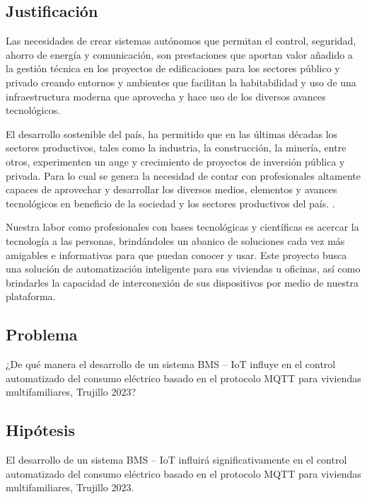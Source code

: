 \documentclass[a4paper, 12pt]{article}
\begin{document}








\subsection{Justificación}

Las necesidades de crear sistemas autónomos que permitan el control, seguridad, ahorro de energía y comunicación, son prestaciones que aportan valor añadido a la gestión técnica en los proyectos de edificaciones para los sectores público y privado creando entornos y ambientes que facilitan la habitabilidad y uso de una infraestructura moderna que aprovecha y hace uso de los diversos avances tecnológicos.

\vspace{0.3cm}
El desarrollo sostenible del país, ha permitido que en las últimas décadas los sectores productivos, tales como la industria, la construcción, la minería, entre otros, experimenten un auge y crecimiento de proyectos de inversión pública y privada. Para lo cual se genera la necesidad de contar con profesionales altamente capaces de aprovechar y desarrollar los diversos medios, elementos y avances tecnológicos en beneficio de la sociedad y los sectores productivos del país. \citep{ARTICLE:2}.

\vspace{0.3cm}
Nuestra labor como profesionales con bases tecnológicas y científicas es acercar la tecnología a las personas, brindándoles un abanico de soluciones cada vez más amigables e informativas para que puedan conocer y usar. Este proyecto busca una solución de automatización inteligente para sus viviendas u oficinas, así como brindarles la capacidad de interconexión de sus dispositivos por medio de nuestra plataforma.

\vspace{0.4cm}



\subsection{Problema}
¿De qué manera el desarrollo de un sistema BMS – IoT influye en el control automatizado del consumo eléctrico basado en el protocolo MQTT para viviendas multifamiliares, Trujillo 2023? 


\subsection{Hipótesis}
El desarrollo de un sistema BMS – IoT influirá significativamente en el control automatizado del consumo eléctrico basado en el protocolo MQTT para viviendas multifamiliares, Trujillo 2023.  
\end{document}
